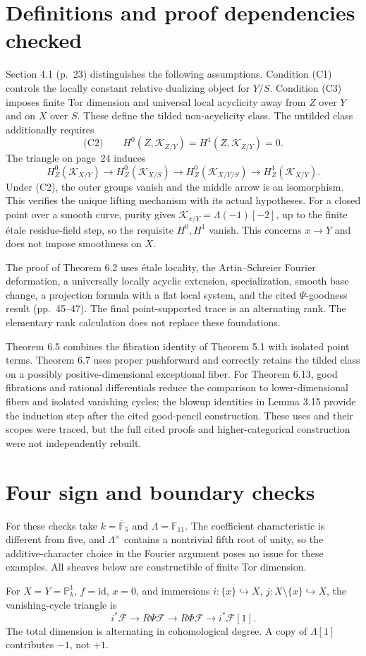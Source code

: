 \documentclass[10pt]{article}
\begin{document}
\section*{Definitions and proof dependencies checked}
Section 4.1 (p. 23) distinguishes the following assumptions. Condition (C1) controls the locally constant relative dualizing object for \(Y/S\). Condition (C3) imposes finite Tor dimension and universal local acyclicity away from \(Z\) over \(Y\) and on \(X\) over \(S\). These define the tilded non-acyclicity class. The untilded class additionally requires \[\text{(C2)}\qquad H^0(Z,\mathcal K_{Z/Y})=H^1(Z,\mathcal K_{Z/Y})=0.\] The triangle on page 24 induces \[H^0_Z(\mathcal K_{X/Y})\longrightarrow
 H^0_Z(\mathcal K_{X/S})\longrightarrow
 H^0_Z(\mathcal K_{X/Y/S})\longrightarrow
 H^1_Z(\mathcal K_{X/Y}).\] Under (C2), the outer groups vanish and the middle arrow is an isomorphism. This verifies the unique lifting mechanism with its actual hypotheses. For a closed point over a smooth curve, purity gives \(\mathcal K_{x/Y}=\Lambda(-1)[-2]\), up to the finite étale residue-field step, so the requisite \(H^0,H^1\) vanish. This concerns \(x\to Y\) and does not impose smoothness on \(X\).\par
The proof of Theorem 6.2 uses étale locality, the Artin–Schreier Fourier deformation, a universally locally acyclic extension, specialization, smooth base change, a projection formula with a flat local system, and the cited \(\Psi\)-goodness result (pp. 45–47). The final point-supported trace is an alternating rank. The elementary rank calculation does not replace these foundations.\par
Theorem 6.5 combines the fibration identity of Theorem 5.1 with isolated point terms. Theorem 6.7 uses proper pushforward and correctly retains the tilded class on a possibly positive-dimensional exceptional fiber. For Theorem 6.13, good fibrations and rational differentials reduce the comparison to lower-dimensional fibers and isolated vanishing cycles; the blowup identities in Lemma 3.15 provide the induction step after the cited good-pencil construction. These uses and their scopes were traced, but the full cited proofs and higher-categorical construction were not independently rebuilt.\par
\section*{Four sign and boundary checks}
For these checks take \(k=\overline{\mathbb F}_5\) and \(\Lambda=\mathbb F_{11}\). The coefficient characteristic is different from five, and \(\Lambda^\times\) contains a nontrivial fifth root of unity, so the additive-character choice in the Fourier argument poses no issue for these examples. All sheaves below are constructible of finite Tor dimension.\par
For \(X=Y=\mathbb P^1_k\), \(f=\mathrm{id}\), \(x=0\), and immersions \(i:\{x\}\hookrightarrow X\), \(j:X\setminus\{x\}\hookrightarrow X\), the vanishing-cycle triangle is \[i^*\mathcal F\longrightarrow R\Psi\mathcal F\longrightarrow R\Phi\mathcal F
 \longrightarrow i^*\mathcal F[1].\] The total dimension is alternating in cohomological degree. A copy of \(\Lambda[1]\) contributes \(-1\), not \(+1\).\par
\end{document}
